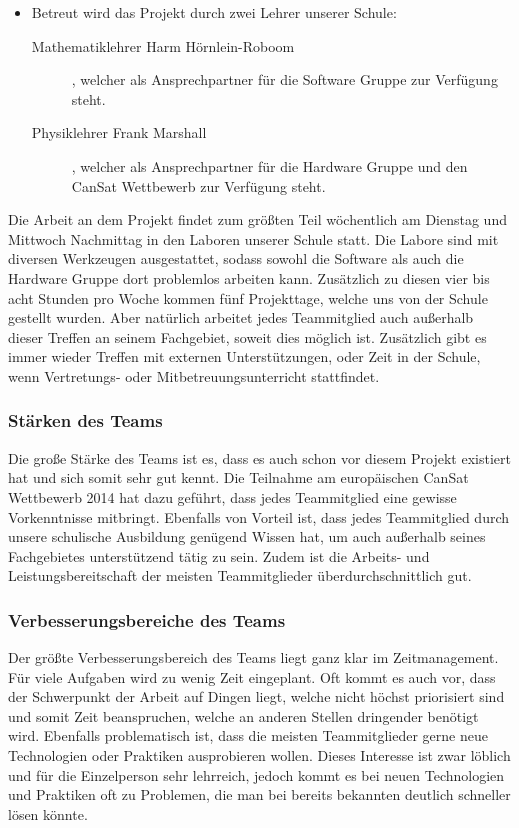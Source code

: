 \begin{itemize}
\item Betreut wird das Projekt durch zwei Lehrer unserer Schule:
\begin{description}
\item [Mathematiklehrer Harm Hörnlein-Roboom], welcher als Ansprechpartner für die Software Gruppe zur Verfügung steht.
\item [Physiklehrer Frank Marshall], welcher als Ansprechpartner für die Hardware Gruppe und den CanSat Wettbewerb zur Verfügung steht.
\end{description}

\end{itemize}

Die Arbeit an dem Projekt findet zum größten Teil wöchentlich am Dienstag und Mittwoch Nachmittag in den Laboren unserer Schule statt. Die Labore sind mit diversen Werkzeugen ausgestattet, sodass sowohl die Software als auch die Hardware Gruppe dort problemlos arbeiten kann. Zusätzlich zu diesen vier bis acht Stunden pro Woche kommen fünf Projekttage, welche uns von der Schule gestellt wurden. Aber natürlich arbeitet jedes Teammitglied auch außerhalb dieser Treffen an seinem Fachgebiet, soweit dies möglich ist. Zusätzlich gibt es immer wieder Treffen mit externen Unterstützungen, oder Zeit in der Schule, wenn Vertretungs- oder Mitbetreuungsunterricht stattfindet.

\subsubsection{Stärken des Teams}
Die große Stärke des Teams ist es, dass es auch schon vor diesem Projekt existiert hat und sich somit sehr gut kennt. Die Teilnahme am europäischen CanSat Wettbewerb 2014 hat dazu geführt, dass jedes Teammitglied eine gewisse Vorkenntnisse mitbringt. Ebenfalls von Vorteil ist, dass jedes Teammitglied durch unsere schulische Ausbildung genügend Wissen hat, um auch außerhalb seines Fachgebietes unterstützend tätig zu sein. Zudem ist die Arbeits- und Leistungsbereitschaft der meisten Teammitglieder überdurchschnittlich gut.

\subsubsection{Verbesserungsbereiche des Teams}
Der größte Verbesserungsbereich des Teams liegt ganz klar im Zeitmanagement. Für viele Aufgaben wird zu wenig Zeit eingeplant. Oft kommt es auch vor, dass der Schwerpunkt der Arbeit auf Dingen liegt, welche nicht höchst priorisiert sind und somit Zeit beanspruchen, welche an anderen Stellen dringender benötigt wird. Ebenfalls problematisch ist, dass die meisten Teammitglieder gerne neue Technologien oder Praktiken ausprobieren wollen. Dieses Interesse ist zwar löblich und für die Einzelperson sehr lehrreich, jedoch kommt es bei neuen Technologien und Praktiken oft zu Problemen, die man bei bereits bekannten deutlich schneller lösen könnte.

